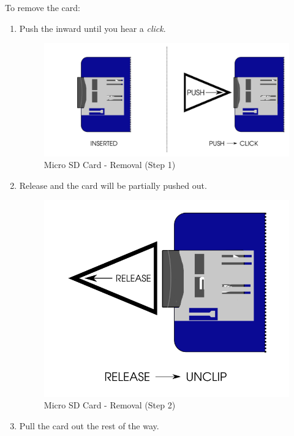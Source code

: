 To remove the card:

\begin{enumerate}
  \item Push the  inward until you hear a \textit{click}.
    \begin{figure}[H]
    \centering
      \includegraphics{images/micro_sd_card_removal_01.png}
    \caption{Micro SD Card - Removal (Step 1)}
    \end{figure}
  \item Release and the card will be partially pushed out.
    \begin{figure}[H]
    \centering
      \includegraphics{images/micro_sd_card_removal_02.png}
    \caption{Micro SD Card - Removal (Step 2)}
    \end{figure}
  \item Pull the card out the rest of the way.
    \begin{figure}[H]
    \centering

\end{figure}
\end{enumerate}
